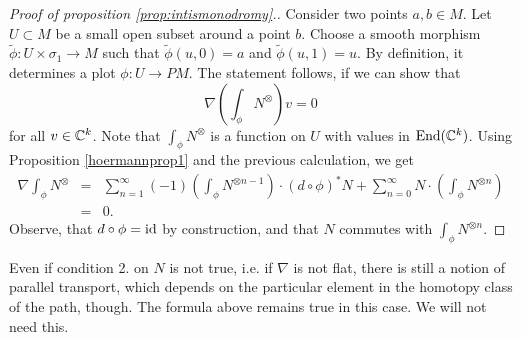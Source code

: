 \begin{proof}[Proof of proposition \ref{prop:intismonodromy}.]
Consider two points $a, b \in M$.
Let $U \subset M$ be a small open subset around a point $b$.
Choose a smooth morphism $\widetilde{\phi}: U \times \sigma_1 \rightarrow M$ 
such that $\widetilde{\phi}(u, 0) = a$ and $\widetilde{\phi}(u, 1) = u$.
By definition, it determines a plot $\phi: U \rightarrow PM$.
The statement follows, if we can show that
\[ \nabla (\int_\phi N^\otimes) v = 0 \]
for all $v \in \mathbb{C}^k$.
Note that $\int_\phi N^\otimes$ is a function on $U$ with values in $\mathrm{End}(\mathbb{C}^k)$. Using Proposition \ref{hoermannprop1} and the previous calculation, we get
\begin{eqnarray*}
\nabla \int_\phi N^{\otimes} & = & \sum_{n=1}^\infty  (-1) (\int_\phi N^{\otimes n - 1}) \cdot   (d \circ \phi)^* N + \sum_{n=0}^\infty N \cdot (\int_\phi N^{\otimes n}) \\
& = & 0.
\end{eqnarray*}
Observe, that $d \circ \phi= \mathrm{id}$ by construction, and that $N$ commutes with $\int_\phi N^{\otimes n}$.
\end{proof}

\begin{rem}Even if condition 2. on $N$ is not true, i.e. if $\nabla$ is not flat, there is still a notion of parallel transport, which depends on
the particular element in the homotopy class of the path, though. The formula above remains true in this case. We will not need this.
\end{rem}




